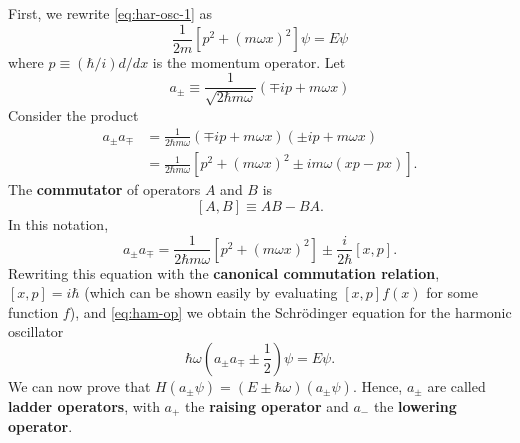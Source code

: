 \documentclass{article}
\begin{document}
First, we rewrite \eqref{eq:har-osc-1} as \[
  \frac{1}{2m}[p^2 + (m \omega x)^2]\psi = E\psi
\] where $p \equiv (\hbar/i)d/dx$ is the momentum operator. Let
\begin{equation} \label{eq:har-osc-alg-a}
  \boxed{
    a_{\pm} \equiv \frac{1}{\sqrt{2 \hbar m \omega}}(\mp ip + m \omega x)
  }
\end{equation}
Consider the product
\begin{align*}
  a_{\pm}a_{\mp}
  &= \frac{1}{2 \hbar m \omega}(\mp ip + m \omega x)(\pm ip + m \omega x) \\
  &= \frac{1}{2 \hbar m \omega}[p^2 + (m \omega x)^2 \pm im\omega(xp - px)].
\end{align*}
The \textbf{commutator} of operators $A$ and $B$ is \[
  [A, B] \equiv AB - BA.
\] In this notation, \[
  a_{\pm}a_{\mp}
  = \frac{1}{2 \hbar m \omega}[p^2 + (m \omega x)^2]
  \pm \frac{i}{2\hbar}[x, p].
\] Rewriting this equation with the \textbf{canonical commutation relation},
$[x, p] = i\hbar$ (which can be shown easily by evaluating $[x, p]f(x)$ for
some function $f$), and \eqref{eq:ham-op} we obtain the Schr\"{o}dinger
equation for the harmonic oscillator
\begin{equation} \label{eq:har-osc-alg}
  \hbar\omega\left(a_{\pm}a_{\mp} \pm \frac{1}{2}\right)\psi = E\psi.
\end{equation}
We can now prove that $H(a_{\pm}\psi) = (E \pm \hbar\omega)(a_{\pm}\psi)$.
Hence, $a_{\pm}$ are called \textbf{ladder operators}, with $a_+$ the
\textbf{raising operator} and $a_-$ the \textbf{lowering operator}.
\end{document}
